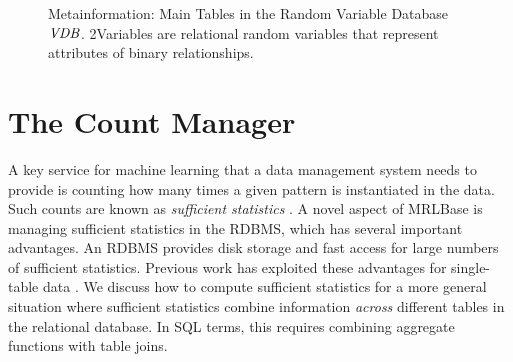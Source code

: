 \documentclass{acm_proc_article-sp}
\begin{document}
\begin{figure}[htbp]
\begin{center}
\caption{Metainformation: Main Tables in the Random Variable Database $\it{VDB}$. 2Variables are relational random variables that represent attributes of binary relationships.
\label{fig:rv_db}}
\end{center}
\end{figure}

\section{The Count Manager} 
A key service for machine learning that a data management system needs to provide is counting how many times a given pattern is instantiated in the data. Such counts are known as {\em sufficient statistics} \cite{Graefe1998}. 
%
A novel aspect of MRLBase is managing sufficient statistics in the RDBMS, which has several important advantages. 
%
An RDBMS provides disk storage and fast access for large numbers of sufficient statistics. Previous work has exploited these advantages for single-table data \cite{Ordonez2010}. We discuss how to compute sufficient statistics for a more general situation where sufficient statistics combine information {\em across} different tables in the relational database. In SQL terms, this requires combining aggregate functions with table joins. 
\end{document}
